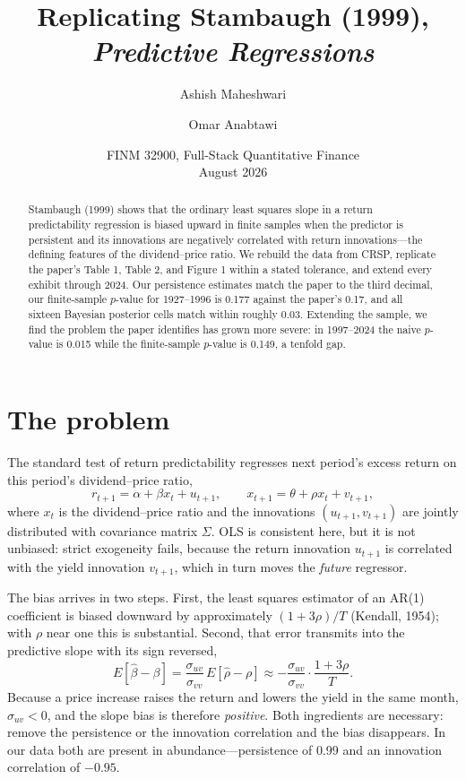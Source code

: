 \documentclass[11pt]{article}
\title{Replicating Stambaugh (1999), \emph{Predictive Regressions}}
\author{Ashish Maheshwari \and Omar Anabtawi}
\date{FINM 32900, Full-Stack Quantitative Finance \\ August 2026}
\begin{document}
\maketitle

\begin{abstract}
\noindent
Stambaugh (1999) shows that the ordinary least squares slope in a return
predictability regression is biased upward in finite samples when the predictor
is persistent and its innovations are negatively correlated with return
innovations---the defining features of the dividend--price ratio. We rebuild the
data from CRSP, replicate the paper's Table 1, Table 2, and Figure 1 within a
stated tolerance, and extend every exhibit through 2024. Our persistence
estimates match the paper to the third decimal, our finite-sample $p$-value for
1927--1996 is 0.177 against the paper's 0.17, and all sixteen Bayesian posterior
cells match within roughly 0.03. Extending the sample, we find the problem the
paper identifies has grown more severe: in 1997--2024 the naive $p$-value is
0.015 while the finite-sample $p$-value is 0.149, a tenfold gap.
\end{abstract}

\section{The problem}

The standard test of return predictability regresses next period's excess
return on this period's dividend--price ratio,
\begin{equation}
r_{t+1} = \alpha + \beta x_t + u_{t+1},
\qquad
x_{t+1} = \theta + \rho x_t + v_{t+1},
\end{equation}
where $x_t$ is the dividend--price ratio and the innovations $(u_{t+1},
v_{t+1})$ are jointly distributed with covariance matrix $\Sigma$. OLS is
consistent here, but it is not unbiased: strict exogeneity fails, because the
return innovation $u_{t+1}$ is correlated with the yield innovation $v_{t+1}$,
which in turn moves the \emph{future} regressor.

The bias arrives in two steps. First, the least squares estimator of an AR(1)
coefficient is biased downward by approximately $(1+3\rho)/T$ (Kendall, 1954);
with $\rho$ near one this is substantial. Second, that error transmits into the
predictive slope with its sign reversed,
\begin{equation}
E[\hat\beta - \beta]
= \frac{\sigma_{uv}}{\sigma_{vv}}\, E[\hat\rho - \rho]
\approx -\frac{\sigma_{uv}}{\sigma_{vv}} \cdot \frac{1+3\rho}{T}.
\label{eq:bias}
\end{equation}
Because a price increase raises the return and lowers the yield in the same
month, $\sigma_{uv} < 0$, and the slope bias is therefore \emph{positive}. Both
ingredients are necessary: remove the persistence or the innovation correlation
and the bias disappears. In our data both are present in abundance---persistence
of 0.99 and an innovation correlation of $-0.95$.
\end{document}
